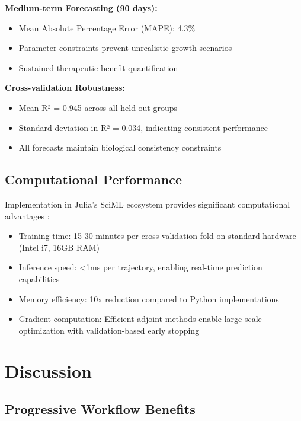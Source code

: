 \documentclass{juliacon}
\begin{document}
\textbf{Medium-term Forecasting (90 days):}
\begin{itemize}
    \item Mean Absolute Percentage Error (MAPE): 4.3\%
    \item Parameter constraints prevent unrealistic growth scenarios
    \item Sustained therapeutic benefit quantification
\end{itemize}

\textbf{Cross-validation Robustness:}
\begin{itemize}
    \item Mean R² = 0.945 across all held-out groups
    \item Standard deviation in R² = 0.034, indicating consistent performance
    \item All forecasts maintain biological consistency constraints
\end{itemize}

\subsection{Computational Performance}

Implementation in Julia's SciML ecosystem provides significant computational advantages \cite{wang2023hybridizing,ramadhan2024data}:

\begin{itemize}
    \item Training time: 15-30 minutes per cross-validation fold on standard hardware (Intel i7, 16GB RAM)
    \item Inference speed: <1ms per trajectory, enabling real-time prediction capabilities
    \item Memory efficiency: 10x reduction compared to Python implementations
    \item Gradient computation: Efficient adjoint methods enable large-scale optimization with validation-based early stopping
\end{itemize}

\section{Discussion}

\subsection{Progressive Workflow Benefits}
\end{document}
